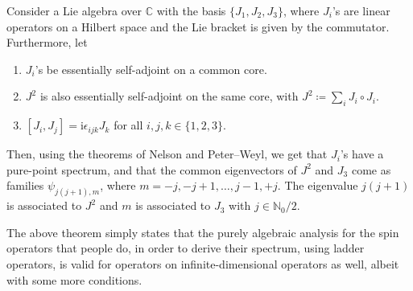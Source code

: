 \documentclass[12pt, a4 paper]{article}
\theoremstyle{definition}
\newcommand{\cc}{\mathbb{C}}
\renewcommand{\i}{\mathrm{i}}
\begin{document}
	Consider a Lie algebra over \(\cc\) with the basis \(\{J_1, J_2, J_3\}\), where \(J_i\)'s are linear operators on a Hilbert space and the Lie bracket is given by the commutator. Furthermore, let
	\begin{enumerate}
	    \item \(J_i\)'s be essentially self-adjoint on a common core.
		\item \(J^2\) is also essentially self-adjoint on the same core, with \(J^2 \coloneq \sum_i J_i \circ J_i\).
		\item \([J_i, J_j] = \i \epsilon_{ijk} J_k\) for all \(i, j, k \in \{1, 2, 3\}\).
	\end{enumerate}
	Then, using the theorems of Nelson and Peter--Weyl, we get that $J_i$'s have a pure-point spectrum, and that the common eigenvectors of $J^2$ and $J_3$ come as families $\psi_{j(j+1), m}$, where $m = -j, -j+1, \ldots, j-1, +j$. The eigenvalue $j(j+1)$ is associated to $J^2$ and $m$ is associated to $J_3$ with $j \in \mathbb{N}_0/2$.

	The above theorem simply states that the purely algebraic analysis for the spin operators that people do, in order to derive their spectrum, using ladder operators, is valid for operators on infinite-dimensional operators as well, albeit with some more conditions.
\end{document}
